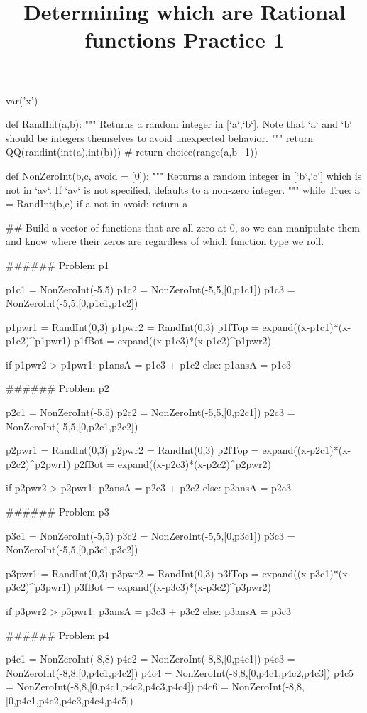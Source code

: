 \documentclass{ximera}
\title{Determining which are Rational functions Practice 1}
\begin{document}
\begin{sagesilent}
var('x')

def RandInt(a,b):
    """ Returns a random integer in [`a`,`b`]. Note that `a` and `b` should be integers themselves to avoid unexpected behavior.
    """
    return QQ(randint(int(a),int(b)))
    # return choice(range(a,b+1))

def NonZeroInt(b,c, avoid = [0]):
    """ Returns a random integer in [`b`,`c`] which is not in `av`. 
        If `av` is not specified, defaults to a non-zero integer.
    """
    while True:
        a = RandInt(b,c)
        if a not in avoid:
            return a

## Build a vector of functions that are all zero at 0, so we can manipulate them and know where their zeros are regardless of which function type we roll.

###### Problem p1

p1c1 = NonZeroInt(-5,5)
p1c2 = NonZeroInt(-5,5,[0,p1c1])
p1c3 = NonZeroInt(-5,5,[0,p1c1,p1c2])

p1pwr1 = RandInt(0,3)
p1pwr2 = RandInt(0,3)
p1fTop = expand((x-p1c1)*(x-p1c2)^p1pwr1)
p1fBot = expand((x-p1c3)*(x-p1c2)^p1pwr2)

if p1pwr2 > p1pwr1:
    p1ansA = p1c3 + p1c2
else:
    p1ansA = p1c3



###### Problem p2

p2c1 = NonZeroInt(-5,5)
p2c2 = NonZeroInt(-5,5,[0,p2c1])
p2c3 = NonZeroInt(-5,5,[0,p2c1,p2c2])

p2pwr1 = RandInt(0,3)
p2pwr2 = RandInt(0,3)
p2fTop = expand((x-p2c1)*(x-p2c2)^p2pwr1)
p2fBot = expand((x-p2c3)*(x-p2c2)^p2pwr2)

if p2pwr2 > p2pwr1:
    p2ansA = p2c3 + p2c2
else:
    p2ansA = p2c3



###### Problem p3

p3c1 = NonZeroInt(-5,5)
p3c2 = NonZeroInt(-5,5,[0,p3c1])
p3c3 = NonZeroInt(-5,5,[0,p3c1,p3c2])

p3pwr1 = RandInt(0,3)
p3pwr2 = RandInt(0,3)
p3fTop = expand((x-p3c1)*(x-p3c2)^p3pwr1)
p3fBot = expand((x-p3c3)*(x-p3c2)^p3pwr2)

if p3pwr2 > p3pwr1:
    p3ansA = p3c3 + p3c2
else:
    p3ansA = p3c3




###### Problem p4

p4c1 = NonZeroInt(-8,8)
p4c2 = NonZeroInt(-8,8,[0,p4c1])
p4c3 = NonZeroInt(-8,8,[0,p4c1,p4c2])
p4c4 = NonZeroInt(-8,8,[0,p4c1,p4c2,p4c3])
p4c5 = NonZeroInt(-8,8,[0,p4c1,p4c2,p4c3,p4c4])
p4c6 = NonZeroInt(-8,8,[0,p4c1,p4c2,p4c3,p4c4,p4c5])


\end{sagesilent}
\end{document}
